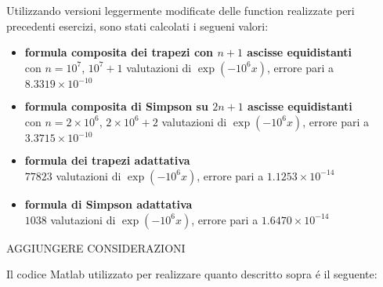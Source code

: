 \begin{center}
\footnotesize\noindent{}
\end{center}

\noindent Utilizzando versioni leggermente modificate delle function realizzate peri precedenti esercizi, sono stati calcolati i segueni valori:

\begin{itemize}

  \item \textbf{formula composita dei trapezi con \(n+1\) ascisse equidistanti} \\ con \(n=10^7\), \(10^7 +1\) valutazioni di \(\exp(-10^6 x)\), errore pari a \(8.3319 \times 10^{-10}\)
  \item \textbf{formula composita di Simpson su \(2n+1\) ascisse equidistanti } \\ con \(n=2 \times 10^6\), \(2 \times 10^6 + 2\) valutazioni di \(\exp(-10^6 x)\), errore pari a \(3.3715 \times 10^{-10}\)
  \item \textbf{formula dei trapezi adattativa} \\ \(77823\) valutazioni di \(\exp(-10^6 x)\), errore pari a \(1.1253 \times 10^{-14}\)
  \item \textbf{formula di Simpson adattativa} \\ \(1038\) valutazioni di \(\exp(-10^6 x)\), errore pari a \(1.6470 \times 10^{-14}\)

\end{itemize}

AGGIUNGERE CONSIDERAZIONI

\noindent Il codice Matlab utilizzato per realizzare quanto descritto sopra \'e il seguente: \\



